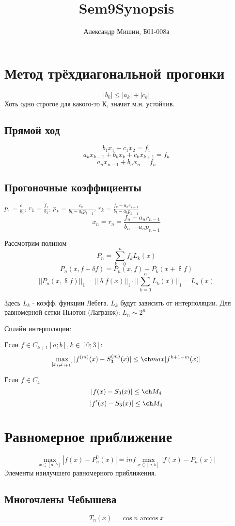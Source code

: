 \documentclass[a4paper,12pt]{article}
\title{Sem9Synopsis}
\begin{document}
\author{Александр Мишин, Б01-008а}
\date{}
\maketitle

\section*{Метод трёхдиагональной прогонки}
\[|b_k| \leq |a_k| + |c_k|\]
Хоть одно строгое для какого-то К, значит м.н. устойчив.
\subsection* {Прямой ход}
\[b_1 x_1 + c_1 x_2 = f_1\]
\[a_k x_{k-1} + b_k x_k + c_k x_{k+1} = f_k\]
\[a_n x_{n-1} + b_n x_n = f_n\]
\subsection*{Прогоночные коэффициенты}
$p_1 = \frac{c_1}{b_1}$, $r_1 = \frac{f_1}{b_1}$, $p_k = \frac{c_k}{b_k - a_k p_{k-1}}$, $r_k = \frac{f_k - a_k r_{k-1}}{b_k - a_k p_{k-1}}$
\[x_n = r_n = \frac{f_n - a_n r_{n-1} }{b_n - a_n p_{n-1}}\]

Рассмотрим полином
\[P_n = \sum_{k=0}^n f_k L_k(x)\]
\[P_n (x, f + \delta f) = P_n(x, f) + P_k(x + \updelta f) \]
\[||P_n (x, \updelta f)||_1 = ||\updelta f(x)||_1 \cdot ||\sum_{k=0}^n L_k(x)||_1 = L_n(x)\]

Здесь $L_k$ - коэфф. функции Лебега. $L_k$ будут зависить от интерполяции. Для равномерной сетки Ньютон (Лагранж): $L_n \sim 2^n$

Сплайн интерполяции:

Если $f \in C_{k+1} [a; b], k \in [0; 3]$:
\[\max_{[x_i, x_{i+1}]} | f^{(m)}(x) - S_3^{(m)}(x)| \leq \ch max |f ^ {k + 1 - m}(x)|\]

Если $f \in C_4$
\[|f(x) - S_3(x)| \leq \ch M_4\]
\[|f'(x) - S_3(x)| \leq \ch M_4\]

\section*{Равномерное приближение}
$$\max_{x \in [a,b]} | f(x) - P_n^0(x)|  = inf \max_{x \in [a,b]} |f(x)-P_n(x)|$$
Элементы наилучшего равномерного приближения. 

\subsection*{Многочлены Чебышева}
\[T_n(x) = \cos{n \arccos{x}}\]
\end{document}
